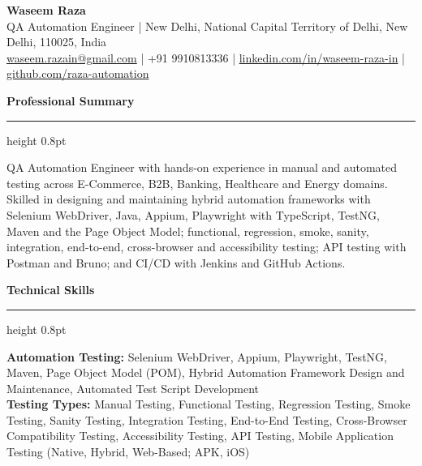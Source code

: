 \documentclass[10pt,a4paper]{article}
\newcommand{\sectionheader}[1]{%
    \vspace{4pt}
    {\normalsize\bfseries #1}
    \vspace{1pt}
    \hrule height 0.8pt
    \vspace{3pt}
}
\begin{document}

\begin{center}
    {\LARGE\bfseries Waseem Raza}\\[3pt]
    QA Automation Engineer | New Delhi, National Capital Territory of Delhi, New Delhi, 110025, India\\
    \href{mailto:waseem.razain@gmail.com}{waseem.razain@gmail.com} | +91 9910813336 | \href{https://www.linkedin.com/in/waseem-raza-in}{linkedin.com/in/waseem-raza-in} | \href{https://github.com/raza-automation}{github.com/raza-automation}
\end{center}

\vspace{1pt}


\sectionheader{Professional Summary}

QA Automation Engineer with hands-on experience in manual and automated testing across E-Commerce, B2B, Banking, Healthcare and Energy domains. Skilled in designing and maintaining hybrid automation frameworks with Selenium WebDriver, Java, Appium, Playwright with TypeScript, TestNG, Maven and the Page Object Model; functional, regression, smoke, sanity, integration, end-to-end, cross-browser and accessibility testing; API testing with Postman and Bruno; and CI/CD with Jenkins and GitHub Actions.


\sectionheader{Technical Skills}

\textbf{Automation Testing:} Selenium WebDriver, Appium, Playwright, TestNG, Maven, Page Object Model (POM), Hybrid Automation Framework Design and Maintenance, Automated Test Script Development\\[1pt]

\textbf{Testing Types:} Manual Testing, Functional Testing, Regression Testing, Smoke Testing, Sanity Testing, Integration Testing, End-to-End Testing, Cross-Browser Compatibility Testing, Accessibility Testing, API Testing, Mobile Application Testing (Native, Hybrid, Web-Based; APK, iOS)\\[1pt]
\end{document}
